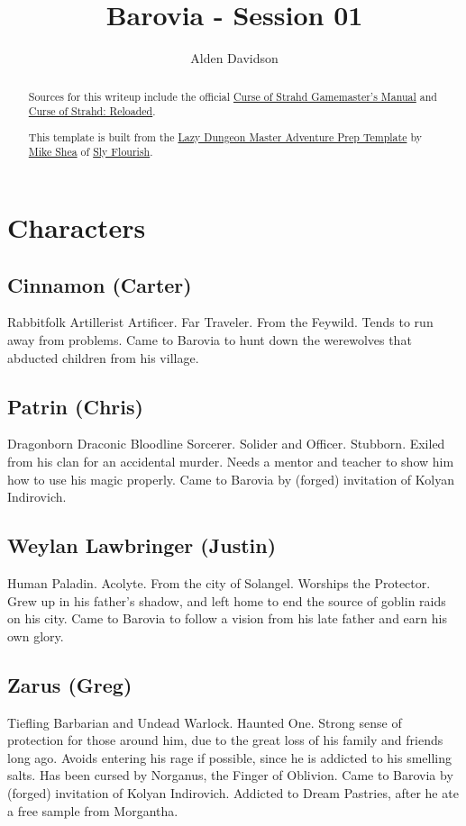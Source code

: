 \documentclass[a4paper,11pt]{article}
\title{Barovia - Session 01}
\author{Alden Davidson}
\begin{document}
\maketitle
\tableofcontents

\begin{abstract}
  Sources for this writeup include the official
  \href{https://5e.tools/adventure.html#cos}{Curse of Strahd Gamemaster's Manual} and
  \href{https://www.reddit.com/r/CurseofStrahd/comments/9bpzbh/curse_of_strahd_reloaded_compilation_thread/}{Curse of Strahd: Reloaded}.
  
  This template is built from the
  \href{https://slyflourish.com/rotldm_template.html}{Lazy Dungeon Master Adventure Prep Template} by
  \href{https://slyflourish.com/about_mike_shea.html}{Mike Shea} of \href{https://slyflourish.com/}{Sly Flourish}.
\end{abstract}

\pagebreak
\section{Characters}
\label{sec:Characters}
\subsection{Cinnamon (Carter)}
  Rabbitfolk Artillerist Artificer. Far Traveler. From the Feywild. Tends to run away from problems. Came to
  Barovia to hunt down the werewolves that abducted children from his village.
\subsection{Patrin (Chris)}
  Dragonborn Draconic Bloodline Sorcerer. Solider and Officer. Stubborn. Exiled from his clan for an accidental 
  murder. Needs a mentor and teacher to show him how to use his magic properly. Came to Barovia by (forged)
  invitation of Kolyan Indirovich.
\subsection{Weylan Lawbringer (Justin)}
  Human Paladin. Acolyte. From the city of Solangel. Worships the Protector. Grew up in his father's shadow, and 
  left home to end the source of goblin raids on his city. Came to Barovia to follow a vision from his late 
  father and earn his own glory.
\subsection{Zarus (Greg)}
  Tiefling Barbarian and Undead Warlock. Haunted One. Strong sense of protection for those around him, due to the
  great loss of his family and friends long ago. Avoids entering his rage if possible, since he is addicted to 
  his smelling salts. Has been cursed by Norganus, the Finger of Oblivion. Came to Barovia by (forged) 
  invitation of Kolyan Indirovich. Addicted to Dream Pastries, after he ate a free sample from Morgantha.
\end{document}

